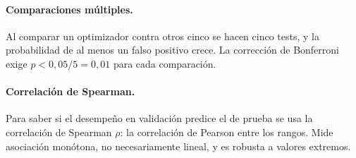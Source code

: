 \paragraph{Comparaciones múltiples.} Al comparar un optimizador contra otros cinco se hacen cinco tests, y la
probabilidad de al menos un falso positivo crece. La corrección de Bonferroni exige $p < 0{,}05/5 = 0{,}01$ para cada
comparación.

\paragraph{Correlación de Spearman.} Para saber si el desempeño en validación predice el de prueba se usa la correlación
de Spearman $\rho$: la correlación de Pearson entre los rangos. Mide asociación monótona, no necesariamente lineal, y
es robusta a valores extremos.
